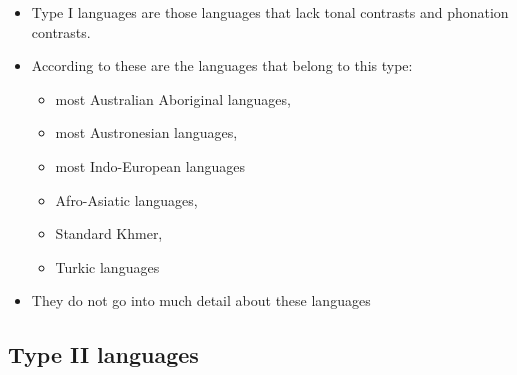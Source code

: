 \begin{itemize}
    \item Type I languages are those languages that lack tonal contrasts and phonation contrasts. 
    \item According to \citet{espositoCrossLinguisticPatterns2020} these are the languages that belong to this type:
    \begin{itemize}
        \item most Australian Aboriginal languages, 
        \item most Austronesian languages, 
        \item most Indo-European languages
        \item Afro-Asiatic languages, 
        \item Standard Khmer,
        \item Turkic languages
    \end{itemize}
    \item They do not go into much detail about these languages 
\end{itemize}

\subsection{Type II languages} \label{sec:TypeII}

